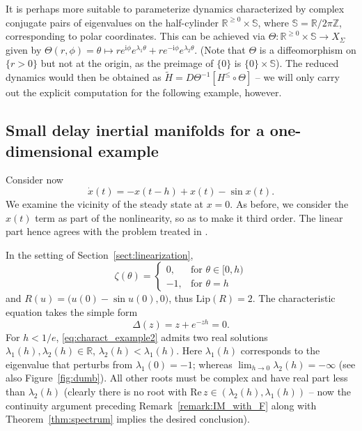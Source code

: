 \documentclass[a4paper, 12pt, oneside, reqno, notitlepage]{amsart}
\theoremstyle{plain}
\theoremstyle{definition}
\theoremstyle{remark}
\newcommand{\lip}{\mathrm{Lip}}
\begin{document}
It is perhaps more suitable to parameterize dynamics characterized by complex conjugate pairs of eigenvalues on the half-cylinder $\mathbb{R}^{\geq 0} \times \mathbb{S}$, where $\mathbb{S} = \mathbb{R}/2\pi \mathbb{Z}$, corresponding to polar coordinates.
This can be achieved via $\Theta : \mathbb{R}^{\geq 0} \times \mathbb{S} \to X_\Sigma$ given by $\Theta(r,\phi) = \theta \mapsto re^{\mathrm{i} \phi}e^{\lambda_1 \theta} +re^{-\mathrm{i} \phi}  e^{\lambda_2 \theta}$. 
(Note that $\Theta$ is a diffeomorphism on $\{r > 0 \}$ but not at the origin, as the preimage of $\{0\}$ is $\{0\} \times \mathbb{S}$).
The reduced dynamics would then be obtained as $\widetilde{H} = D\Theta^{-1} [ H^\leq \circ \Theta]$ -- we will only carry out the explicit computation for the following example, however.


\subsection{Small delay inertial manifolds for a one-dimensional example}
\label{sect:example2}

Consider now
\begin{equation}
    \dot{x}(t) =-x(t-h)  + x(t) - \sin x(t).
    \label{eq:example2}
\end{equation}
We examine the vicinity of the steady state at $x=0$.
As before, we consider the $x(t)$ term as part of the nonlinearity, so as to make it third order.
The linear part hence agrees with the problem treated in \cite{szaksz2025spectral}.

In the setting of Section~\ref{sect:linearization},  
\begin{displaymath}
    \zeta(\theta) = \begin{cases}
                0, & \text{for } \theta \in [0,h)\\
        -1, & \text{for } \theta = h
    \end{cases}
\end{displaymath}
and $R(u) = \big(u(0) -\sin u(0) ,0 \big)$, thus $\lip(R) = 2$.
The characteristic equation takes the simple form
\begin{equation}
    \Delta(z) = z +e^{-zh} = 0.
    \label{eq:charact_example2}
\end{equation}
For $h < 1/e$, \eqref{eq:charact_example2} admits two real solutions $\lambda_1(h),\lambda_2(h) \in \mathbb{R}$, $\lambda_2(h) < \lambda_1(h)$.
Here $\lambda_1(h)$ corresponds to the eigenvalue that perturbs from  $\lambda_1(0) = -1$; whereas $\lim_{h\to 0}\lambda_2(h) = - \infty$ (see also Figure~\ref{fig:dumb}). 
All other roots must be complex and have real part less than $\lambda_2(h)$ (clearly there is no root with $\mathrm{Re} \, z \in (\lambda_2(h),\lambda_1(h))$ -- now the continuity argument preceding Remark~\ref{remark:IM_with_F} along with Theorem~\ref{thm:spectrum} implies the desired conclusion). 
\end{document}
